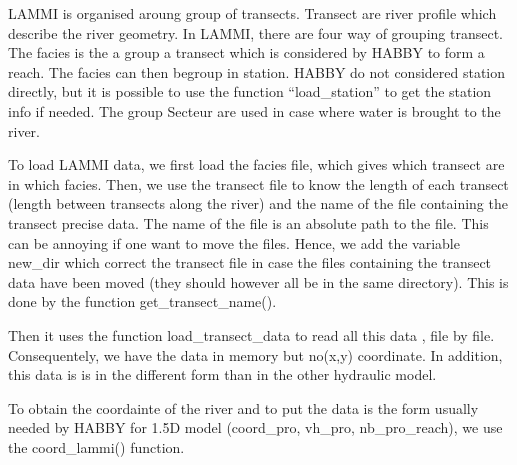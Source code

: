 \documentclass[letterpaper,10pt,english]{sphinxmanual}
\begin{document}
\begin{fulllineitems}
LAMMI is organised aroung group of transects. Transect are river profile which describe the river geometry.
In LAMMI, there are four way of grouping transect. The facies is the a group a transect which is considered by HABBY
to form a reach. The facies can then begroup in station. HABBY do not considered station directly, but it is
possible to use the function ``load\_station'' to get the station info if needed. The group Secteur are used in case
where water is brought to the river.

To load LAMMI data, we first load the facies file, which gives which transect are in which facies. Then, we use
the transect file to know the length of each transect (length between transects along the river) and the
name of the file containing the transect precise data. The name of the file is an absolute path to the file.
This can be annoying if one want to move the files. Hence, we add the variable new\_dir which correct the transect
file in case the files containing the transect data have been moved (they should however all be in the same
directory). This is done by the function get\_transect\_name().

Then it uses the function load\_transect\_data to read all this data , file by file. Consequentely, we have
the data in memory but no(x,y) coordinate. In addition, this data is is in the different form than in the other
hydraulic model.

To obtain the coordainte of the river and to put the data is the form usually needed by HABBY for 1.5D model
(coord\_pro, vh\_pro, nb\_pro\_reach), we use the coord\_lammi() function.

\end{fulllineitems}

\end{document}
